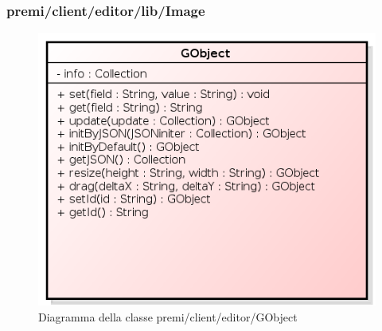 \subsubsection{premi/client/editor/lib/Image}
\begin{figure}[h]
\begin{center}
\includegraphics[scale=0.40]{img/diacla/GObject.png}
\caption{Diagramma della classe premi/client/editor/GObject}
\end{center}
\end{figure}

